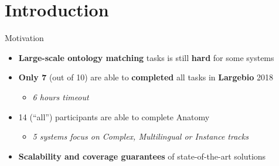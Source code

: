 \documentclass[t]{beamer}
\title{}
\subtitle{We Divide, You Conquer: From Large-scale Ontology Alignment to Manageable Subtasks}
\date{October 8, 2018}
\author{\textbf{Ernesto Jim\'enez-Ruiz}, Asan Agibetov, Matthias Samwald, Valerie Cross}
\begin{document}
\begin{frame}
	\titlepage
\end{frame}


\section{Introduction}



\begin{frame}{Motivation}

  		\begin{itemize}    
  			\item \textbf{Large-scale ontology matching} tasks is still \textbf{hard} for some systems
  			\item \textbf{Only 7} (out of 10) are able to \textbf{completed} all tasks in \textbf{Largebio} 2018 
  			\begin{itemize}
  			    \item \textit{6 hours timeout}
  			\end{itemize}
  			\item 14 (``all'') participants are able to complete Anatomy
  			\begin{itemize}
  			    \item \textit{5 systems focus on Complex, Multilingual or Instance tracks}
  			\end{itemize}
  			\item \textbf{Scalability and coverage guarantees} of state-of-the-art solutions
  		\end{itemize}
  	
\end{frame}
\end{document}
